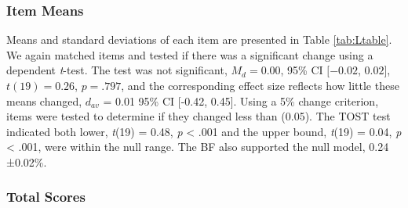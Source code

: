 \documentclass[english,man, mask]{apa6}
\theoremstyle{definition}
\theoremstyle{definition}
\theoremstyle{definition}
\theoremstyle{remark}
\begin{document}
\subsubsection{Item Means}\label{item-means-1}

Means and standard deviations of each item are presented in Table
\ref{tab:Ltable}. We again matched items and tested if there was a
significant change using a dependent \emph{t}-test. The test was not
significant, \(M_d = 0.00\), 95\% CI \([-0.02\), \(0.02]\),
\(t(19) = 0.26\), \(p = .797\), and the corresponding effect size
reflects how little these means changed, \(d_{av}\) = 0.01 95\% CI
{[}-0.42, 0.45{]}. Using a 5\% change criterion, items were tested to
determine if they changed less than (0.05). The TOST test indicated both
lower, \emph{t}(19) = 0.48, \emph{p} \textless{} .001 and the upper
bound, \emph{t}(19) = 0.04, \emph{p} \textless{} .001, were within the
null range. The BF also supported the null model, 0.24 ±0.02\%.

\subsubsection{Total Scores}\label{total-scores-1}
\end{document}
